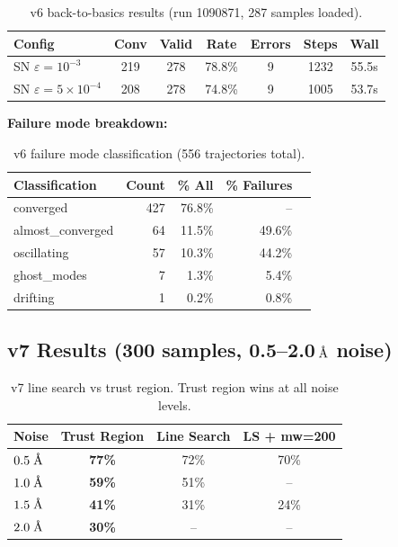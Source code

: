 \documentclass[11pt,a4paper]{article}
\newcommand{\angstrom}{\text{\r{A}}}
\begin{document}
\begin{table}[H]
\centering
\caption{v6 back-to-basics results (run 1090871, 287 samples loaded).}
\label{tab:v6-results}
\begin{tabular}{lcccccc}
\toprule
Config & Conv & Valid & Rate & Errors & Steps & Wall \\
\midrule
SN $\varepsilon=10^{-3}$ & 219 & 278 & 78.8\% & 9 & 1232 & 55.5s \\
SN $\varepsilon=5\times10^{-4}$ & 208 & 278 & 74.8\% & 9 & 1005 & 53.7s \\
\bottomrule
\end{tabular}
\end{table}

\textbf{Failure mode breakdown:}
\begin{table}[H]
\centering
\caption{v6 failure mode classification (556 trajectories total).}
\label{tab:v6-failures}
\begin{tabular}{lrrrr}
\toprule
Classification & Count & \% All & \% Failures \\
\midrule
converged & 427 & 76.8\% & -- \\
almost\_converged & 64 & 11.5\% & 49.6\% \\
oscillating & 57 & 10.3\% & 44.2\% \\
ghost\_modes & 7 & 1.3\% & 5.4\% \\
drifting & 1 & 0.2\% & 0.8\% \\
\bottomrule
\end{tabular}
\end{table}

\subsection{v7 Results (300 samples, 0.5--2.0\,$\angstrom$ noise)}
\label{sec:v7-results}

\begin{table}[H]
\centering
\caption{v7 line search vs trust region. Trust region wins at all noise levels.}
\label{tab:v7-results}
\begin{tabular}{lccc}
\toprule
Noise & Trust Region & Line Search & LS + mw=200 \\
\midrule
$0.5\;\angstrom$ & \textbf{77\%} & 72\% & 70\% \\
$1.0\;\angstrom$ & \textbf{59\%} & 51\% & -- \\
$1.5\;\angstrom$ & \textbf{41\%} & 31\% & 24\% \\
$2.0\;\angstrom$ & \textbf{30\%} & -- & -- \\
\bottomrule
\end{tabular}
\end{table}
\end{document}
